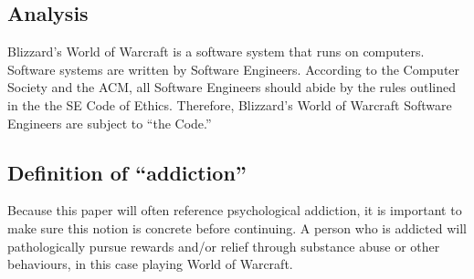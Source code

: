 \documentclass[11pt]{article}
\begin{document}
\begin{multicols}{2}

\section{Analysis}

Blizzard's World of Warcraft is a software system that runs on computers. \cite{WoWSystemReqs} Software systems are written by Software Engineers. \cite{ACMApprovesSECode} According to the Computer Society and the ACM, all Software Engineers should abide by the rules outlined in the the SE Code of Ethics. \cite{ACMApprovesSECode}\cite{SECode} Therefore, Blizzard's World of Warcraft Software Engineers are subject to “the Code.” \cite{SECode}

\subsection{Definition of ``addiction''}
Because this paper will often reference psychological addiction, it is important to make sure this notion is concrete before continuing.
A person who is addicted will pathologically pursue rewards and/or relief through substance abuse or other behaviours, in this case playing World of Warcraft. \cite{DefinitionOfAddiction}


\end{multicols}
\end{document}
